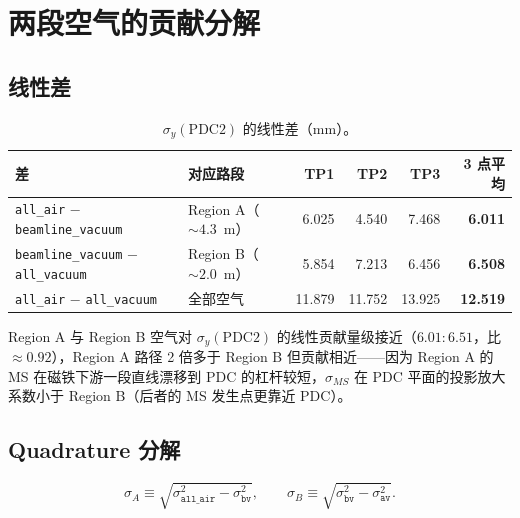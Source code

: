 \documentclass[a4paper, 11pt]{article}
\begin{document}
\section{两段空气的贡献分解}

\subsection{线性差}

\begin{table}[H]
\centering
\caption{$\sigma_y(\mathrm{PDC2})$ 的线性差（mm）。}
\label{tab:delta_linear}
\begin{tabular}{llrrrr}
\toprule
差 & 对应路段 & TP1 & TP2 & TP3 & 3 点平均 \\
\midrule
\texttt{all\_air} $-$ \texttt{beamline\_vacuum}    & Region A（$\sim 4.3$~m） & 6.025 & 4.540 & 7.468 & \textbf{6.011} \\
\texttt{beamline\_vacuum} $-$ \texttt{all\_vacuum} & Region B（$\sim 2.0$~m） & 5.854 & 7.213 & 6.456 & \textbf{6.508} \\
\texttt{all\_air} $-$ \texttt{all\_vacuum}         & 全部空气                & 11.879 & 11.752 & 13.925 & \textbf{12.519} \\
\bottomrule
\end{tabular}
\end{table}

Region A 与 Region B 空气对 $\sigma_y(\mathrm{PDC2})$ 的线性贡献量级接近（$6.01 : 6.51$，比 $\approx 0.92$），Region A 路径 2 倍多于 Region B 但贡献相近——因为 Region A 的 MS 在磁铁下游一段直线漂移到 PDC 的杠杆较短，$\sigma_{MS}$ 在 PDC 平面的投影放大系数小于 Region B（后者的 MS 发生点更靠近 PDC）。

\subsection{Quadrature 分解}

\[
   \sigma_{A} \equiv \sqrt{\sigma_{\mathtt{all\_air}}^{2} - \sigma_{\mathtt{bv}}^{2}}, \qquad
   \sigma_{B} \equiv \sqrt{\sigma_{\mathtt{bv}}^{2}     - \sigma_{\mathtt{av}}^{2}}.
\]
\end{document}
